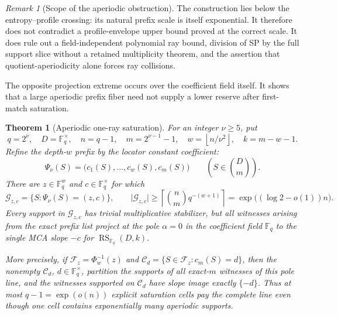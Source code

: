 \documentclass[11pt,a4paper]{amsart}
\numberwithin{equation}{section}
\newtheorem{theorem}{Theorem}[section]
\theoremstyle{remark}
\newtheorem{remark}[remark]{Remark}
\DeclareMathOperator{\RS}{RS}
\newcommand{\F}{\mathbb F}
\newcommand{\Ccal}{\mathcal C}
\newcommand{\Fcal}{\mathcal F}
\newcommand{\Gcal}{\mathcal G}
\newcommand{\abs}[1]{\lvert #1\rvert}
\newcommand{\floor}[1]{\left\lfloor #1\right\rfloor}
\newcommand{\ceil}[1]{\left\lceil #1\right\rceil}
\begin{document}
\begin{remark}[Scope of the aperiodic obstruction]
The construction lies below the entropy--profile crossing: its natural
prefix scale is itself exponential.  It therefore does not contradict a
profile-envelope upper bound proved at the correct scale.  It does rule
out a field-independent polynomial ray bound, division of SP by the full
support slice without a retained multiplicity theorem, and the assertion
that quotient-aperiodicity alone forces ray collisions.
\end{remark}

The opposite projection extreme occurs over the coefficient field itself.
It shows that a large aperiodic prefix fiber need not supply a lower
reserve after first-match saturation.

\begin{theorem}[Aperiodic one-ray saturation]
\label{thm:aperiodic-one-ray-saturation}
For an integer \(\nu\ge5\), put
\[
 q=2^\nu,\quad D=\F_q^\times,\quad n=q-1,\quad
 m=2^{\nu-1}-1,\quad w=\floor{n/\nu^2},\quad k=m-w-1.
\]
Refine the depth-\(w\) prefix by the locator constant coefficient:
\[
 \Psi_\nu(S)=\bigl(c_1(S),\ldots,c_w(S),c_m(S)\bigr)
 \qquad\left(S\in\binom Dm\right).
\]
There are \(z\in\F_q^w\) and \(c\in\F_q^\times\) for which
\[
 \Gcal_{z,c}=\{S:\Psi_\nu(S)=(z,c)\},
 \qquad
 \abs{\Gcal_{z,c}}
 \ge\ceil{\binom nm q^{-(w+1)}}
 =\exp\bigl((\log2-o(1))n\bigr).                  \tag{SAT1}
\label{eq:one-ray-large-fiber}
\]
Every support in \(\Gcal_{z,c}\) has trivial multiplicative stabilizer,
but all witnesses arising from the exact prefix list project at the pole
\(\alpha=0\) in the coefficient field \(\F_q\) to the single MCA slope \(-c\) for
\(\RS_{\F_q}(D,k)\).

More precisely, if \(\Fcal_z=\Phi_w^{-1}(z)\) and
\(\Ccal_d=\{S\in\Fcal_z:c_m(S)=d\}\), then the nonempty
\(\Ccal_d\), \(d\in\F_q^\times\), partition the supports of all
exact-\(m\) witnesses of this pole line, and the witnesses supported on
\(\Ccal_d\) have slope image exactly \(\{-d\}\).  Thus at most
\(q-1=\exp(o(n))\) explicit saturation cells
pay the complete line even though one cell contains exponentially many
aperiodic supports.
\end{theorem}
\end{document}
